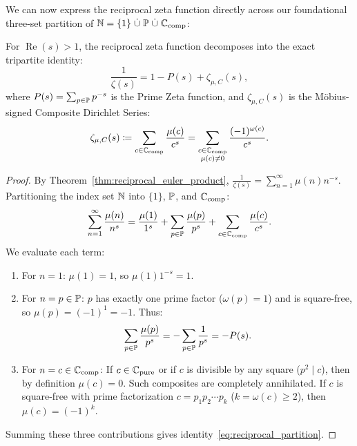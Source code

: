 We can now express the reciprocal zeta function directly across our foundational three-set partition of $\mathbb{N} = \{1\} \;\dot{\cup}\; \mathbb{P} \;\dot{\cup}\; \mathbb{C}_{\mathrm{comp}}$:

\begin{proposition}
\label{prop:reciprocal_partition}
\leanok
For $\operatorname{Re}(s) > 1$, the reciprocal zeta function decomposes into the exact tripartite identity:
\begin{equation}
\label{eq:reciprocal_partition}
\frac{1}{\zeta(s)} = 1 - P(s) + \zeta_{\mu, C}(s),
\end{equation}
where $P(s) = \sum_{p \in \mathbb{P}} p^{-s}$ is the Prime Zeta function, and $\zeta_{\mu, C}(s)$ is the M\"obius-signed Composite Dirichlet Series:
\begin{equation}
\label{eq:mobius_composite_series}
\zeta_{\mu, C}(s) \coloneqq \sum_{c \in \mathbb{C}_{\mathrm{comp}}} \frac{\mu(c)}{c^s} = \sum_{\substack{c \in \mathbb{C}_{\mathrm{comp}} \\ \mu(c) \neq 0}} \frac{(-1)^{\omega(c)}}{c^s}.
\end{equation}
\end{proposition}

\begin{proof}
\leanok
By Theorem~\ref{thm:reciprocal_euler_product}, $\frac{1}{\zeta(s)} = \sum_{n=1}^\infty \mu(n) n^{-s}$. Partitioning the index set $\mathbb{N}$ into $\{1\}$, $\mathbb{P}$, and $\mathbb{C}_{\mathrm{comp}}$:
$$\sum_{n=1}^\infty \frac{\mu(n)}{n^s} = \frac{\mu(1)}{1^s} + \sum_{p \in \mathbb{P}} \frac{\mu(p)}{p^s} + \sum_{c \in \mathbb{C}_{\mathrm{comp}}} \frac{\mu(c)}{c^s}.$$
We evaluate each term:
\begin{enumerate}[label=(\alph*)]
  \item For $n = 1$: $\mu(1) = 1$, so $\mu(1) 1^{-s} = 1$.
  \item For $n = p \in \mathbb{P}$: $p$ has exactly one prime factor ($\omega(p) = 1$) and is square-free, so $\mu(p) = (-1)^1 = -1$. Thus:
  $$\sum_{p \in \mathbb{P}} \frac{\mu(p)}{p^s} = -\sum_{p \in \mathbb{P}} \frac{1}{p^s} = -P(s).$$
  \item For $n = c \in \mathbb{C}_{\mathrm{comp}}$: If $c \in \mathbb{C}_{\mathrm{pure}}$ or if $c$ is divisible by any square ($p^2 \mid c$), then by definition $\mu(c) = 0$. Such composites are completely annihilated.
  If $c$ is square-free with prime factorization $c = p_1 p_2 \cdots p_k$ ($k = \omega(c) \ge 2$), then $\mu(c) = (-1)^k$.
\end{enumerate}
Summing these three contributions gives identity~\eqref{eq:reciprocal_partition}.
\end{proof}

